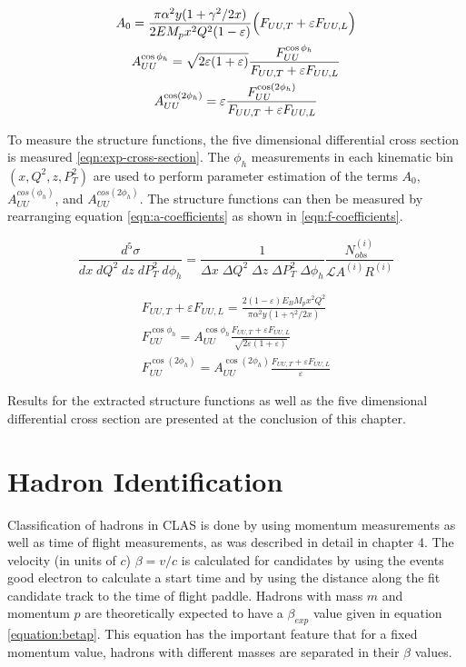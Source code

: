 \begin{gather}
	A_{0} = \frac{\pi \alpha^2 y (1+\gamma^2/2x)}{2 E M_p x^2 Q^2 (1-\varepsilon)} \Bigl( F_{UU,T} + \varepsilon F_{UU,L} \Bigr) \\
	A_{UU}^{\cos\phi_h} = \sqrt{2\varepsilon(1+\varepsilon)} \frac{F_{UU}^{\cos\phi_h}}{F_{UU,T} + \varepsilon F_{UU,L}} \\
	A_{UU}^{\cos(2\phi_h)} = \varepsilon \frac{F_{UU}^{\cos(2\phi_h)}}{F_{UU,T} + \varepsilon F_{UU,L}}
	\label{eqn:a-coefficients}
\end{gather}

To measure the structure functions, the five dimensional differential cross section is measured \ref{eqn:exp-cross-section}.  The $\phi_h$ measurements in each kinematic bin $(x, Q^2, z, P_T^2)$ are used to perform parameter estimation of the terms $A_{0}$, $A_{UU}^{cos(\phi_h)}$, and $A_{UU}^{cos(2\phi_h)}$.  The structure functions can then be measured by rearranging equation \ref{eqn:a-coefficients} as shown in \ref{eqn:f-coefficients}.

\begin{equation}
	\frac{d^5\sigma}{dx \; dQ^2 \; dz \; dP_T^2 \; d\phi_h} = \frac{1}{\Delta x \; \Delta Q^2 \; \Delta z \; \Delta P_T^2 \; \Delta \phi_h} \frac{N_{obs}^{(i)}}{\mathcal{L} A^{(i)} R^{(i)}} 
	\label{eqn:exp-cross-section}
\end{equation}

\begin{gather}
	\label{eqn:f-coefficients}
	F_{UU,T} + \varepsilon F_{UU,L} = \frac{2 (1-\varepsilon) E_B M_p x^2 Q^2}{\pi \alpha^2 y (1 + \gamma^2/2x)} \\
	F_{UU}^{\cos\phi_h} = A_{UU}^{\cos\phi_h}  \frac{ F_{UU,T} + \varepsilon F_{UU,L}}{\sqrt{2\varepsilon(1+\varepsilon)}} \\
	F_{UU}^{\cos(2\phi_h)} = A_{UU}^{\cos(2\phi_h)} \frac{ F_{UU,T} + \varepsilon F_{UU,L}}{\varepsilon}
\end{gather}

Results for the extracted structure functions as well as the five dimensional differential cross section are presented at the conclusion of this chapter.  

\section{Hadron Identification}
%
%

Classification of hadrons in CLAS is done by using momentum measurements as well as time of flight measurements, as was described in detail in chapter 4.  The velocity (in units of $c$) $\beta = v/c$ is calculated for candidates by using the events good electron to calculate a start time and by using the distance along the fit candidate track to the time of flight paddle.  Hadrons with mass $m$ and momentum $p$ are theoretically expected to have a $\beta_{exp}$ value given in equation \ref{equation:betap}.  This equation has the important feature that for a fixed momentum value, hadrons with different masses are separated in their $\beta$ values.

